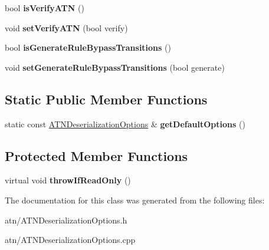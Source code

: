 \begin{DoxyCompactItemize}
\mbox{\label{classantlr4_1_1atn_1_1ATNDeserializationOptions_ab4a9cd8654e425f266825520c0b96588}} 
bool {\bfseries is\+Verify\+A\+TN} ()
\item 
\mbox{\label{classantlr4_1_1atn_1_1ATNDeserializationOptions_ae323852fdeb297428519eaa69d7cb1c8}} 
void {\bfseries set\+Verify\+A\+TN} (bool verify)
\item 
\mbox{\label{classantlr4_1_1atn_1_1ATNDeserializationOptions_a828a11936772939844686dfc7d879da2}} 
bool {\bfseries is\+Generate\+Rule\+Bypass\+Transitions} ()
\item 
\mbox{\label{classantlr4_1_1atn_1_1ATNDeserializationOptions_aa6af4f41c9ec5990c04c03bf5db790ea}} 
void {\bfseries set\+Generate\+Rule\+Bypass\+Transitions} (bool generate)
\end{DoxyCompactItemize}
\subsection*{Static Public Member Functions}
\begin{DoxyCompactItemize}
\item 
\mbox{\label{classantlr4_1_1atn_1_1ATNDeserializationOptions_a045ca6e8199ccfc8df2deb0b8d4decc2}} 
static const \hyperlink{classantlr4_1_1atn_1_1ATNDeserializationOptions}{A\+T\+N\+Deserialization\+Options} \& {\bfseries get\+Default\+Options} ()
\end{DoxyCompactItemize}
\subsection*{Protected Member Functions}
\begin{DoxyCompactItemize}
\item 
\mbox{\label{classantlr4_1_1atn_1_1ATNDeserializationOptions_ad94e6e8dad3c194181af4a59969e0ca4}} 
virtual void {\bfseries throw\+If\+Read\+Only} ()
\end{DoxyCompactItemize}


The documentation for this class was generated from the following files\+:\begin{DoxyCompactItemize}
\item 
atn/A\+T\+N\+Deserialization\+Options.\+h\item 
atn/A\+T\+N\+Deserialization\+Options.\+cpp\end{DoxyCompactItemize}
